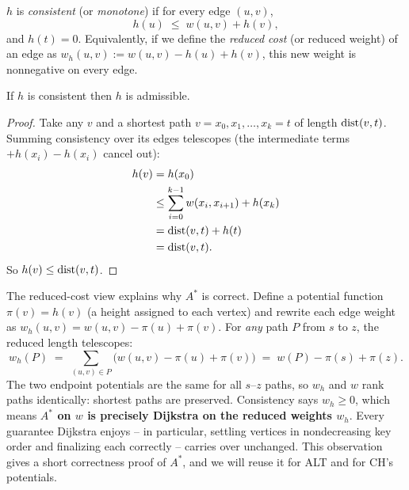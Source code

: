 \begin{definition}
\label{ch08:def-consistent}
$h$ is \emph{consistent} (or \emph{monotone}) if for every edge $(u,v)$,
\[
  h(u) \;\le\; w(u,v) + h(v),
\]
and $h(t)=0$. Equivalently, if we define the \emph{reduced cost} (or reduced weight) of an edge as $w_h(u,v) := w(u,v) - h(u) + h(v)$, this new weight is nonnegative on every edge.
\end{definition}

\begin{lemma}
\label{ch08:lem-cons-adm}
If $h$ is consistent then $h$ is admissible.
\end{lemma}
\begin{proof}
Take any $v$ and a shortest path $v=x_0,x_1,\dots,x_k=t$ of length
$\operatorname{dist}(v,t)$. Summing consistency over its edges telescopes (the intermediate terms $+h(x_i) - h(x_i)$ cancel out):
\[
\begin{aligned}
  h(v) &= h(x_0) \\
  &\le \sum_{i=0}^{k-1} w(x_i,x_{i+1}) + h(x_k) \\
  &= \operatorname{dist}(v,t) + h(t) \\
  &= \operatorname{dist}(v,t).
\end{aligned}
\]
So $h(v)\le\operatorname{dist}(v,t)$.
\end{proof}

The reduced-cost view explains why $A^*$ is correct. Define a potential function $\pi(v)=h(v)$ (a height assigned to each vertex) and rewrite each edge weight as $w_h(u,v)=w(u,v)-\pi(u)+\pi(v)$.
For \emph{any} path $P$ from $s$ to $z$, the reduced length telescopes:
\[
  w_h(P) \;=\; \sum_{(u,v)\in P}\bigl(w(u,v)-\pi(u)+\pi(v)\bigr)
         \;=\; w(P) - \pi(s) + \pi(z).
\]
The two endpoint potentials are the same for all $s$--$z$ paths, so $w_h$ and $w$
rank paths identically: shortest paths are preserved. Consistency says
$w_h\ge 0$, which means \textbf{$A^*$ on $w$ is precisely Dijkstra on the
reduced weights $w_h$}. Every guarantee Dijkstra enjoys -- in particular,
settling vertices in nondecreasing key order and finalizing each correctly --
carries over unchanged. This observation gives a short correctness proof of
$A^*$, and we will reuse it for ALT and for CH's potentials.

